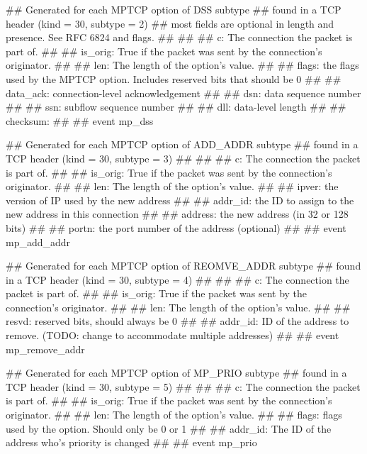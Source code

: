 \begin{code}

## Generated for each MPTCP option of DSS subtype
## found in a TCP header (kind = 30, subtype = 2) 
## most fields are optional in length and presence. See RFC 6824 and flags.
## 
##
## c: The connection the packet is part of.
##
## is_orig: True if the packet was sent by the connection's originator.
##
## len: The length of the option's value.
##
## flags: the flags used by the MPTCP option. Includes reserved bits that should be 0
##
## data_ack: connection-level acknowledgement
##
## dsn: data sequence number
##
## ssn: subflow sequence number
##
## dll: data-level length
##
## checksum: 
##
## 
event mp_dss%

\end{code}

\begin{code}


## Generated for each MPTCP option of ADD_ADDR subtype
## found in a TCP header (kind = 30, subtype = 3) 
## 
##
## c: The connection the packet is part of.
##
## is_orig: True if the packet was sent by the connection's originator.
##
## len: The length of the option's value.
##
## ipver: the version of IP used by the new address
##
## addr_id: the ID to assign to the new address in this connection
##
## address: the new address (in 32 or 128 bits)
##
## portn: the port number of the address (optional)
##
## 
event mp_add_addr%

\end{code}

\begin{code}


## Generated for each MPTCP option of REOMVE_ADDR subtype
## found in a TCP header (kind = 30, subtype = 4) 
## 
##
## c: The connection the packet is part of.
##
## is_orig: True if the packet was sent by the connection's originator.
##
## len: The length of the option's value.
##
## resvd: reserved bits, should always be 0
##
## addr_id: ID of the address to remove. (TODO: change to accommodate multiple addresses)
##
## 
event mp_remove_addr%


\end{code}

\begin{code}

## Generated for each MPTCP option of MP_PRIO subtype
## found in a TCP header (kind = 30, subtype = 5) 
## 
##
## c: The connection the packet is part of.
##
## is_orig: True if the packet was sent by the connection's originator.
##
## len: The length of the option's value.
##
## flags: flags used by the option. Should only be 0 or 1
##
## addr_id: The ID of the address who's priority is changed
##
## 
event mp_prio%


\end{code}

